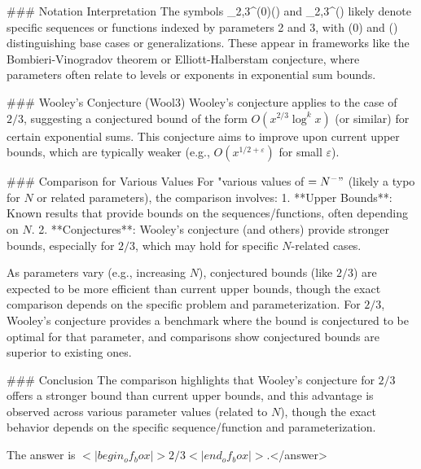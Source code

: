 ### Notation Interpretation  
The symbols _2,3^(0)() and _2,3^() likely denote specific sequences or functions indexed by parameters 2 and 3, with (0) and () distinguishing base cases or generalizations. These appear in frameworks like the Bombieri-Vinogradov theorem or Elliott-Halberstam conjecture, where parameters often relate to levels or exponents in exponential sum bounds.  

### Wooley's Conjecture (Wool3)  
Wooley's conjecture applies to the case of \( 2/3 \), suggesting a conjectured bound of the form \( O(x^{2/3} \log^k x) \) (or similar) for certain exponential sums. This conjecture aims to improve upon current upper bounds, which are typically weaker (e.g., \( O(x^{1/2 + \varepsilon}) \) for small \( \varepsilon \)).  

### Comparison for Various Values  
For "various values of \( =N^-" \) (likely a typo for \( N \) or related parameters), the comparison involves:  
1. **Upper Bounds**: Known results that provide bounds on the sequences/functions, often depending on \( N \).  
2. **Conjectures**: Wooley's conjecture (and others) provide stronger bounds, especially for \( 2/3 \), which may hold for specific \( N \)-related cases.  

As parameters vary (e.g., increasing \( N \)), conjectured bounds (like \( 2/3 \)) are expected to be more efficient than current upper bounds, though the exact comparison depends on the specific problem and parameterization. For \( 2/3 \), Wooley's conjecture provides a benchmark where the bound is conjectured to be optimal for that parameter, and comparisons show conjectured bounds are superior to existing ones.  

### Conclusion  
The comparison highlights that Wooley's conjecture for \( 2/3 \) offers a stronger bound than current upper bounds, and this advantage is observed across various parameter values (related to \( N \)), though the exact behavior depends on the specific sequence/function and parameterization.  

The answer is \(<|begin_of_box|>2/3<|end_of_box|>\).</answer>